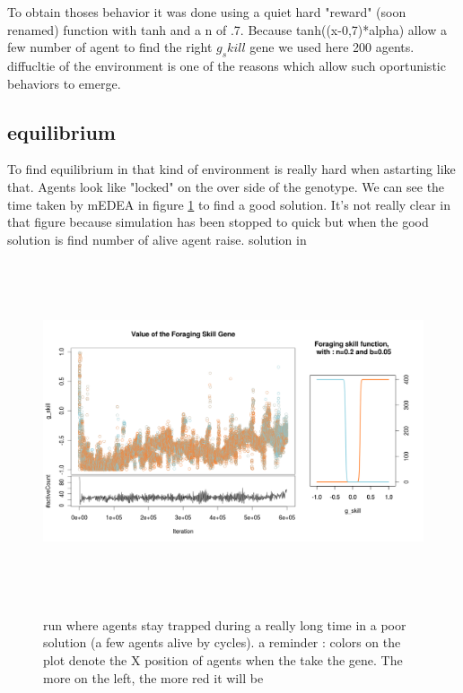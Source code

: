 \documentclass[a4paper,10pt]{article}
\begin{document}
To obtain thoses behavior it was done using a quiet hard "reward" (soon renamed) function with tanh and a n of .7. Because tanh((x-0,7)*alpha) allow a few number of agent to find the right $g_skill$ 
gene we used here 200 agents. diffucltie of the environment is one of the reasons which allow such oportunistic behaviors to emerge.

\subsection{equilibrium}


To find equilibrium in that kind of environment is really hard when astarting like that. Agents look like "locked" on the over side of the genotype. We can see the time taken by mEDEA in figure  \ref{fig:hardtofind} to find a good solution. It's not really clear in that figure because simulation has been stopped to quick but when the good solution is find number of alive agent raise. solution in 

\begin{figure}
	\caption{run where agents stay trapped during a really long time in a poor solution (a few agents alive by cycles). 
		\small a reminder : colors on the plot denote the X position of agents when the take the gene. The more on the left, the more red it will be}
	\begin{center}
 
		\label{fig:hardtofind}
		\includegraphics[height=10cm]{tanh_opportunists1}
	\end{center}
\end{figure}
\end{document}
